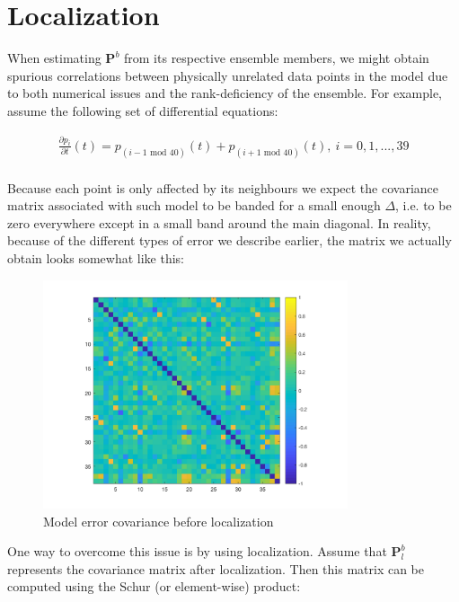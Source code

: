 \documentclass{article}
\begin{document}
\section{Localization}

When estimating $\mathbf{P}^b$ from its respective ensemble members, we might obtain spurious correlations between physically unrelated data points in the model due to both numerical issues and the rank-deficiency of the ensemble. For example, assume the following set of differential equations:

\begin{gather*}
\frac{\partial p_i}{\partial t} (t) = p_{(i - 1 \text{ mod } 40)} (t) + p_{(i + 1 \text{ mod } 40)} (t), \: i = 0, 1, ... , 39 \\
\end{gather*}

Because each point is only affected by its neighbours we expect the covariance matrix associated with such model to be banded for a small enough $\Delta$, i.e. to be zero everywhere except in a small band around the main diagonal. In reality, because of the different types of error we describe earlier, the matrix we actually obtain looks somewhat like this:

\begin{figure}[H]
\begin{center}
\includegraphics[width=0.8\textwidth]{covariance_before_localization}
\caption{Model error covariance before localization \cite{ROInets}}
\end{center}
\end{figure}

One way to overcome this issue is by using localization. Assume that $\mathbf{P}_l^b$ represents the covariance matrix after localization. Then this matrix can be computed using the Schur (or element-wise) product:
\end{document}
